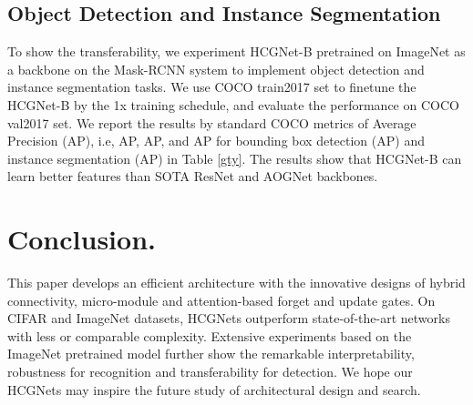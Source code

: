 \documentclass[letterpaper]{article}
\begin{document}
 	\subsection{Object Detection and Instance Segmentation}
 	To show the transferability, we experiment HCGNet-B pretrained on ImageNet as a backbone on the Mask-RCNN system to implement object detection and instance segmentation tasks. We use COCO train2017 set to finetune the HCGNet-B by the 1x training schedule, and evaluate the performance on COCO val2017 set. We report the results by standard COCO metrics of Average Precision (AP), i.e, AP, AP, and AP for bounding box detection (AP) and instance segmentation (AP)  in Table \ref{gty}. The results show that HCGNet-B can learn better features than SOTA ResNet and AOGNet backbones.
 	
 	\section{Conclusion.}
 	This paper develops an efficient architecture with the innovative designs of hybrid connectivity, micro-module and attention-based forget and update gates. On CIFAR and ImageNet datasets, HCGNets outperform state-of-the-art networks with less or comparable complexity. Extensive experiments based on the ImageNet pretrained model further show the remarkable interpretability, robustness for recognition and transferability for detection. We hope our HCGNets may inspire the future study of architectural design and search.
 	
 	
 	
 	
 
\end{document}
